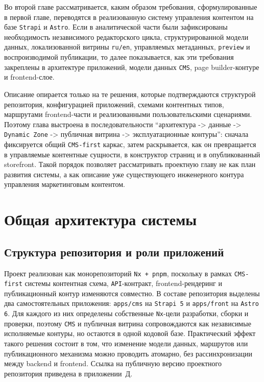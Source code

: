 Во второй главе рассматривается, каким образом требования, сформулированные в первой
главе, переводятся в реализованную систему управления контентом на базе
\texttt{Strapi} и \texttt{Astro}. Если в аналитической части были зафиксированы
необходимость независимого редакторского цикла, структурированной модели данных,
локализованной витрины \texttt{ru/en}, управляемых метаданных, \texttt{preview} и
воспроизводимой публикации, то далее показывается, как эти требования закреплены в
архитектуре приложений, модели данных \texttt{CMS}, page builder-контуре и
frontend-слое.

Описание опирается только на те решения, которые подтверждаются структурой
репозитория, конфигурацией приложений, схемами контентных типов, маршрутами
frontend-части и реализованными пользовательскими сценариями. Поэтому глава
выстроена в последовательности ``архитектура -> данные -> \texttt{Dynamic Zone} ->
публичная витрина -> эксплуатационные контуры'': сначала фиксируется общий
\texttt{CMS-first} каркас, затем раскрывается, как он превращается в управляемые
контентные сущности, в конструктор страниц и в опубликованный storefront. Такой
порядок позволяет рассматривать проектную главу не как план развития системы, а как
описание уже существующего инженерного контура управления маркетинговым контентом.

\section{Общая архитектура системы}

\subsection{Структура репозитория и роли приложений}

Проект реализован как монорепозиторий \texttt{Nx + pnpm}, поскольку в рамках
\texttt{CMS-first} системы контентная схема, \texttt{API}-контракт, frontend-рендеринг
и публикационный контур изменяются совместно. В составе репозитория выделены два
самостоятельных приложения: \texttt{apps/cms} на \texttt{Strapi 5} и
\texttt{apps/front} на \texttt{Astro 6}. Для каждого из них определены собственные
\texttt{Nx}-цели разработки, сборки и проверки, поэтому \texttt{CMS} и публичная
витрина сопровождаются как независимые исполняемые контуры, но остаются в одной кодовой
базе. Практический эффект такого решения состоит в том, что изменение модели данных,
маршрутов или публикационного механизма можно проводить атомарно, без рассинхронизации
между backend и frontend. Ссылка на публичную версию проектного репозитория приведена
в приложении~Д.

